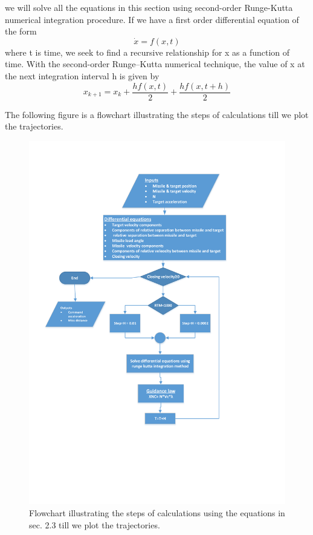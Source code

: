 we will solve all the equations in this section using second-order Runge-Kutta numerical integration procedure. If we have a first order differential equation of the form 
\begin{equation*}
\dot{x} = f(x,t) 
\end{equation*} 
where t is time, we seek to find a recursive relationship for x as a function of time.
With the second-order Runge–Kutta numerical technique, the value of x at the
next integration interval h is given by
\begin{equation*}
x_{k+1} = x_k + \dfrac{hf(x,t)}{2} + \dfrac{h f(x, t+h)}{2}
\end{equation*}


The following figure is a flowchart illustrating the steps of calculations till we plot the trajectories.

\begin{figure}[H]
	\centering
	\includegraphics[scale = 0.7]{fig/FlowchartPN.pdf}
	\caption{Flowchart illustrating the steps of calculations using the equations in sec. 2.3  till we plot the trajectories.}
	\label{flowchart PN}
\end{figure}












